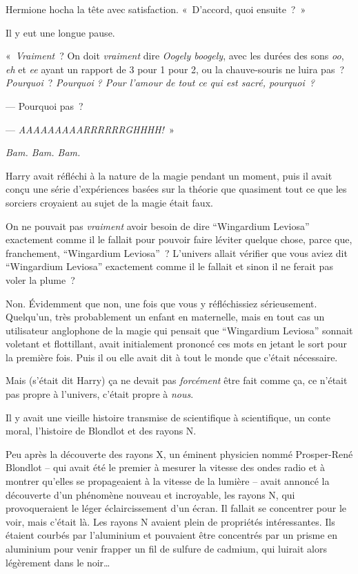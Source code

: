 Hermione hocha la tête avec satisfaction. «~D'accord, quoi ensuite~?~»

Il y eut une longue pause.

«~\emph{Vraiment}~? On doit \emph{vraiment} dire \emph{Oogely boogely}, avec les durées des sons \emph{oo}, \emph{eh} et \emph{ee} ayant un rapport de 3 pour 1 pour 2, ou la chauve-souris ne luira pas~? \emph{Pourquoi}~? \emph{Pourquoi} \emph{? Pour l'amour de tout ce qui est sacré, pourquoi~?}

--- Pourquoi pas~?

--- \emph{AAAAAAAAARRRRRRGHHHH!}~»

\emph{Bam. Bam. Bam.}

Harry avait réfléchi à la nature de la magie pendant un moment, puis il avait conçu une série d'expériences basées sur la théorie que quasiment tout ce que les sorciers croyaient au sujet de la magie était faux.

On ne pouvait pas \emph{vraiment} avoir besoin de dire “Wingardium Leviosa” exactement comme il le fallait pour pouvoir faire léviter quelque chose, parce que, franchement, “Wingardium Leviosa”~? L'univers allait vérifier que vous aviez dit “Wingardium Leviosa” exactement comme il le fallait et sinon il ne ferait pas voler la plume~?

Non. Évidemment que non, une fois que vous y réfléchissiez sérieusement. Quelqu'un, très probablement un enfant en maternelle, mais en tout cas un utilisateur anglophone de la magie qui pensait que “Wingardium Leviosa” sonnait voletant et flottillant, avait initialement prononcé ces mots en jetant le sort pour la première fois. Puis il ou elle avait dit à tout le monde que c'était nécessaire.

Mais (s'était dit Harry) ça ne devait pas \emph{forcément} être fait comme ça, ce n'était pas propre à l'univers, c'était propre à \emph{nous}.

Il y avait une vieille histoire transmise de scientifique à scientifique, un conte moral, l'histoire de Blondlot et des rayons N.

Peu après la découverte des rayons X, un éminent physicien nommé Prosper-René Blondlot -- qui avait été le premier à mesurer la vitesse des ondes radio et à montrer qu'elles se propageaient à la vitesse de la lumière -- avait annoncé la découverte d'un phénomène nouveau et incroyable, les rayons N, qui provoqueraient le léger éclaircissement d'un écran. Il fallait se concentrer pour le voir, mais c'était là. Les rayons N avaient plein de propriétés intéressantes. Ils étaient courbés par l'aluminium et pouvaient être concentrés par un prisme en aluminium pour venir frapper un fil de sulfure de cadmium, qui luirait alors légèrement dans le noir…

